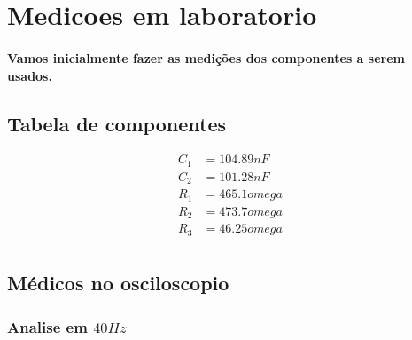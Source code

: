 \documentclass[12pt,twoside, a4paper, twocolumn]{article}
\begin{document}
\section{Medicoes em laboratorio}


\paragraph{Vamos inicialmente fazer as medições dos componentes a serem usados.}


\subsection{Tabela de componentes}


\begin{equation*}
    \begin{aligned}
        C_1 & = 104.89nF    \\
        C_2 & = 101.28nF    \\
        R_1 & = 465.1 omega \\
        R_2 & = 473.7 omega \\
        R_3 & = 46.25 omega \\
    \end{aligned}
\end{equation*}


\subsection{Médicos no osciloscopio}


\subsubsection*{Analise em $40Hz$}
\subparagraph*{}
\end{document}
